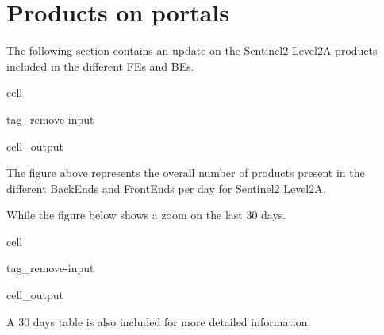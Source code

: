 \documentclass[letterpaper,10pt,english]{jupyterBook}
\begin{document}
\section{Products on portals}
\label{\detokenize{S2L2A_portals:products-on-portals}}
\sphinxAtStartPar
The following section contains an update on the Sentinel\sphinxhyphen{}2 Level\sphinxhyphen{}2A products included in the different FEs and BEs.

\begin{sphinxuseclass}{cell}
\begin{sphinxuseclass}{tag_remove-input}\begin{sphinxVerbatimOutput}

\begin{sphinxuseclass}{cell_output}
\noindent{}

\end{sphinxuseclass}\end{sphinxVerbatimOutput}

\end{sphinxuseclass}
\end{sphinxuseclass}
\sphinxAtStartPar
The figure above represents the overall number of products present in the different BackEnds and FrontEnds per day for Sentinel\sphinxhyphen{}2 Level\sphinxhyphen{}2A.

\sphinxAtStartPar
While the figure below shows a zoom on the last 30 days.

\begin{sphinxuseclass}{cell}
\begin{sphinxuseclass}{tag_remove-input}\begin{sphinxVerbatimOutput}

\begin{sphinxuseclass}{cell_output}
\noindent{}

\end{sphinxuseclass}\end{sphinxVerbatimOutput}

\end{sphinxuseclass}
\end{sphinxuseclass}
\sphinxAtStartPar
A 30 days table is also included for more detailed information.
\end{document}
